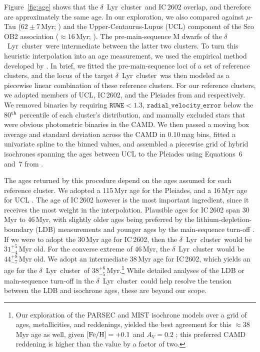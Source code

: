 \documentclass[12pt,modern,twocolumn,tighten]{aastex63}
\newcommand{\cn}{$\delta$\ Lyr\ cluster} %
\newcommand{\clusterage}{$38^{+6}_{-5}$\,Myr} %
\begin{document}
Figure~\ref{fig:age} shows that the \cn\ and IC\,2602 overlap, and
therefore are approximately the same age.  In our exploration, we also
compared against $\mu$-Tau ($62\pm7$\,Myr; \citealt{gagne_mutau_2020})
and the Upper-Centaurus-Lupus (UCL) component of the Sco OB2
association ($\approx$$16$\,Myr; \citealt{pecaut_star_2016}).  The
pre-main-sequence M dwarfs of the \cn\ were intermediate between the
latter two clusters.  To turn this heuristic interpolation into an age
measurement, we used the empirical method developed by
\citet{gagne_mutau_2020}.  In brief, we fitted the pre-main-sequence
loci of a set of reference clusters, and the locus of the target \cn\
was then modeled as a piecewise linear combination of these reference
clusters.  For our reference clusters, we adopted members of UCL,
IC\,2602, and the Pleiades from \citet{damiani_stellar_2019} and
\cite{CantatGaudin2018a} respectively.  We removed binaries by
requiring $\texttt{RUWE}<1.3$, $\texttt{radial\_velocity\_error}$
below the 80$^{\rm th}$ percentile of each cluster's distribution, and
manually excluded stars that were obvious photometric binaries in the
CAMD.  We then passed a moving box average and standard deviation
across the CAMD in 0.10\,mag bins, fitted a univariate spline to the
binned values, and assembled a piecewise grid of hybrid isochrones
spanning the ages between UCL to the Pleiades using Equations~6 and~7
from \citet{gagne_mutau_2020}.  


The ages returned by this procedure depend on the ages assumed for
each reference cluster.  We adopted a 115\,Myr age for the Pleiades,
and a 16\,Myr age for UCL \citep{dahm_2015,pecaut_star_2016}.  The age
of IC\,2602 however is the most important ingredient, since it
receives the most weight in the interpolation.  Plausible ages for
IC\,2602 span 30\,Myr to 46\,Myr, with slightly older ages being
preferred by the lithium-depletion-boundary (LDB) measurements and
younger ages by the main-sequence turn-off
\citep{stauffer_rotational_1997,dobbie_ic_2010,david_ages_2015,randich_gaiaeso_2018,bossini_age_2019,bouma_cluster_2020}.
If we were to adopt the 30\,Myr age for IC\,2602, then the \cn\ would
be $31^{+5}_{-4}$\,Myr old.  For the converse extreme of 46\,Myr, the
\cn\ would be $44^{+8}_{-7}$\,Myr old.  We adopt an intermediate
38\,Myr age for IC\,2602, which yields an age for the \cn\ of
\clusterage.\footnote{Our exploration of the PARSEC and MIST isochrone
models over a grid of ages, metallicities, and reddenings, yielded the
best agreement for this $\approx 38\,$Myr age as well, given ${\rm
[Fe/H] = +0.1}$ and $A_V=0.2$
\citep{bressan_parsec_2012,choi_mesa_2016};  this preferred CAMD
reddening is higher than the \citet{lallement_threedimensional_2018}
value by a factor of two.  } While detailed analyses of the LDB or
main-sequence turn-off in the \cn\ could help resolve the tension
between the LDB and isochrone ages, these are beyond our scope.
\end{document}
